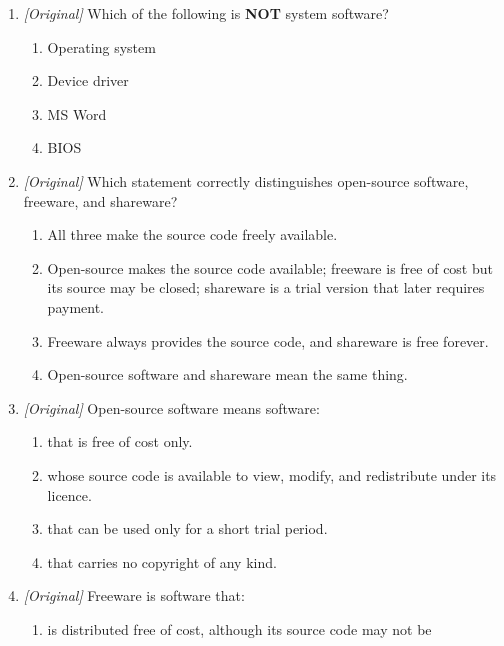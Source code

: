 \documentclass[11pt]{article}
\begin{document}
\begin{enumerate}[label=\textbf{Q\arabic*.}, leftmargin=*]
\begin{enumerate}[label=\Alph*.]
      between the operating system and application software.
    \item the physical wiring that connects two computers.
    \item a free trial version of a software product.
    \item the hardware located inside the CPU.
  \end{enumerate}
\item \textit{[Original]} Which of the following is \textbf{NOT} system
  software?
  \begin{enumerate}[label=\Alph*.]
    \item Operating system
    \item Device driver
    \item MS Word
    \item BIOS
  \end{enumerate}
\item \textit{[Original]} Which statement correctly distinguishes open-source
  software, freeware, and shareware?
  \begin{enumerate}[label=\Alph*.]
    \item All three make the source code freely available.
    \item Open-source makes the source code available; freeware is free of
      cost but its source may be closed; shareware is a trial version that
      later requires payment.
    \item Freeware always provides the source code, and shareware is free
      forever.
    \item Open-source software and shareware mean the same thing.
  \end{enumerate}
\item \textit{[Original]} Open-source software means software:
  \begin{enumerate}[label=\Alph*.]
    \item that is free of cost only.
    \item whose source code is available to view, modify, and redistribute
      under its licence.
    \item that can be used only for a short trial period.
    \item that carries no copyright of any kind.
  \end{enumerate}
\item \textit{[Original]} Freeware is software that:
  \begin{enumerate}[label=\Alph*.]
    \item is distributed free of cost, although its source code may not be

\end{enumerate}
\end{enumerate}
\end{document}
